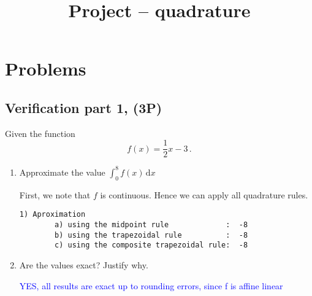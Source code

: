 \documentclass[11pt,oneside,reqno]{amsart}
\author{}
\title{Project -- quadrature}
\begin{document}
\providecommand{\bydef}{\coloneqq}



\section{Problems}
\subsection{Verification part 1, (3P)}
\label{sec:ej31}
Given the function 
\[ f(x) = \frac{1}{2}x - 3\,. \]
\begin{enumerate}
\setlength{\labelsep}{1em}\setlength\itemsep{0.75em}%
\item 
 Approximate the value  $\int_0^8 f(x) \,\mathrm{d}x$ 


{\color{blue}
First, we note that $f$ is continuous. Hence we can apply all quadrature rules.
\begin{verbatim}
1) Aproximation
        a) using the midpoint rule             :  -8
        b) using the trapezoidal rule          :  -8
        c) using the composite trapezoidal rule:  -8
\end{verbatim}}


\item Are the values exact? Justify why.

\textcolor{blue}{YES, all results are exact up to rounding errors, since f is  affine linear}
\end{enumerate}


\bigskip
\end{document}
